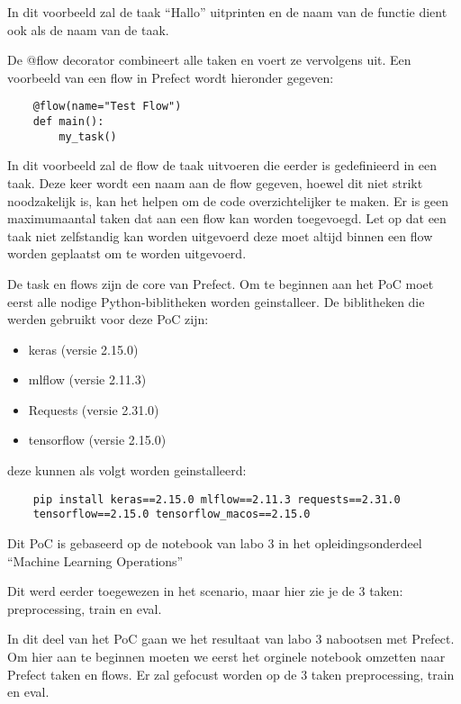 In dit voorbeeld zal de taak ``Hallo'' uitprinten en de naam van de functie dient ook als de naam van de taak.

De @flow decorator combineert alle taken en voert ze vervolgens uit. Een voorbeeld van een flow in Prefect wordt hieronder gegeven:
\begin{verbatim}
    @flow(name="Test Flow")
    def main():
        my_task()
\end{verbatim}
In dit voorbeeld zal de flow de taak uitvoeren die eerder is gedefinieerd in een taak. Deze keer wordt een naam aan de flow gegeven, hoewel dit niet strikt noodzakelijk is, kan het helpen om de code overzichtelijker te maken. Er is geen maximumaantal taken dat aan een flow kan worden toegevoegd. Let op dat een taak niet zelfstandig kan worden uitgevoerd deze moet altijd binnen een flow worden geplaatst om te worden uitgevoerd.

De task en flows zijn de core van Prefect. Om te beginnen aan het PoC moet eerst alle nodige Python-biblitheken worden geinstalleer.
De biblitheken die werden gebruikt voor deze PoC zijn:
\begin{itemize}
    \item keras (versie 2.15.0)
    \item mlflow (versie 2.11.3)
    \item Requests (versie 2.31.0)
    \item tensorflow (versie 2.15.0)
\end{itemize}

deze kunnen als volgt worden geinstalleerd: 

\begin{verbatim}
    pip install keras==2.15.0 mlflow==2.11.3 requests==2.31.0
    tensorflow==2.15.0 tensorflow_macos==2.15.0
\end{verbatim}

Dit PoC is gebaseerd op de notebook van labo 3 in het opleidingsonderdeel ``Machine Learning Operations''


Dit werd eerder toegewezen in het scenario, maar hier zie je de 3 taken: preprocessing, train en eval.

In dit deel van het PoC gaan we het resultaat van labo 3 nabootsen met Prefect.
Om hier aan te beginnen moeten we eerst het orginele notebook omzetten naar Prefect taken en flows. Er zal gefocust worden op de 3 taken preprocessing, train en eval.


